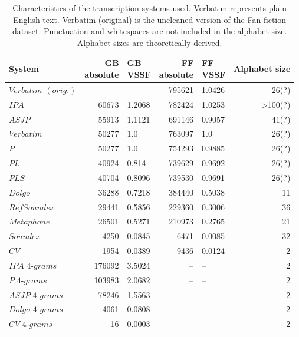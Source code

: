 \begin{table}
\caption{Characteristics of the transcription systems used. Verbatim represents plain English text. Verbatim (original) is the uncleaned version of the Fan-fiction dataset. Punctuation and whitespaces are not included in the alphabet size. Alphabet sizes are theoretically derived.}
\label{tab:system_characteristics}
\centering\small
\begin{tabular}{@{}l@{\hspace{1\tabcolsep}}rlrlr@{}} %
\toprule
\bf System & \bf \specialcell{GB\\absolute} & \bf \specialcell{GB\\VSSF} & \bf \specialcell{FF\\absolute} & \bf \specialcell{FF\\VSSF} & \bf Alphabet size \\
\midrule
$Verbatim$ $(orig.)$ & -- & -- & 795621 & 1.0426 & 26(?) \\
$IPA$ & 60673 & 1.2068 & 782424 & 1.0253 & >100(?) \\
$ASJP$ & 55913 & 1.1121 & 691146 & 0.9057 & 41(?) \\
$Verbatim$ & 50277 & 1.0 & 763097 & 1.0 & 26(?) \\
$P$ & 50277 & 1.0 & 754293 & 0.9885 & 26(?) \\
$PL$ & 40924 & 0.814 & 739629 & 0.9692 & 26(?) \\
$PLS$ & 40704 & 0.8096 & 739530 & 0.9691 & 26(?) \\
$Dolgo$ & 36288 & 0.7218 & 384440 & 0.5038 & 11 \\
$RefSoundex$ & 29441 & 0.5856 & 229360 & 0.3006 & 36 \\
$Metaphone$ & 26501 & 0.5271 & 210973 & 0.2765 & 21 \\
$Soundex$ & 4250 & 0.0845 & 6471 & 0.0085 & 32 \\
$CV$ & 1954 & 0.0389 & 9436 & 0.0124 & 2 \\
$IPA$ $4$-$grams$ & 176092 & 3.5024 & -- & -- & 2 \\
$P$ $4$-$grams$ & 103983 & 2.0682 & -- & -- & 2 \\
$ASJP$ $4$-$grams$ & 78246 & 1.5563 & -- & -- & 2 \\
$Dolgo$ $4$-$grams$ & 4061 & 0.0808 & -- & -- & 2 \\
$CV$ $4$-$grams$ & 16 & 0.0003 & -- & -- & 2 \\
\bottomrule
\end{tabular}
\end{table}
